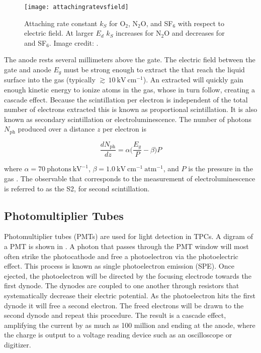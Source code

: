 \begin{figure}
\texttt{[image: attachingratevsfield]}
\caption[Attaching rate constant $k_{S}$ for O$_{2}$, N$_{2}$O, and SF$_{6}$ with respect to electric field.]{Attaching rate constant $k_{S}$
for O$_{2}$, N$_{2}$O, and SF$_{6}$ with respect to electric field.  At
larger $E_d$ $k_{S}$ increases for N$_{2}$O and decreases for \otwo and SF$_{6}$.  Image credit: .}
\label{fig:attachment_rate}
\end{figure}

The anode rests several millimeters above the gate.  The electric field between the gate and anode $E_{g}$ must be strong
enough to extract the \electron that reach the liquid surface into the gas (typically ${\gtrsim}\, 10\ \mathrm{kV\ cm^{-1}}$).  An
extracted \electron will quickly gain enough kinetic energy to ionize atoms in the gas,
whose \electron in turn follow, creating a cascade effect.  Because the scintillation per electron is independent of
the total number of electrons extracted this is known as proportional scintillation.  It is also known as secondary scintillation or
electroluminescence.  The number of photons $N_{\mathrm{ph}}$ produced over a distance $z$ per electron is

\begin{equation}
\frac{dN_{\mathrm{ph}}}{dz} = \alpha \bigg( \frac{E_{g}}{P} - \beta \bigg) P
\label{eq:electronlum}
\end{equation}

\noindent where $\alpha = 70\ \mathrm{photons\ kV^{-1}}$, $\beta = 1.0\ \mathrm{kV\ cm^{-1}\ atm^{-1}}$, and $P$ is the pressure in the
gas .  The observable that corresponds to the measurement of electroluminescence is referred to as the S2, for
second scintillation.


\subsection{Photomultiplier Tubes}
\label{subsec:tpcs_pmts}
Photomultiplier tubes (PMTs) are used for light detection in TPCs.  A digram of a PMT is shown in .  A
photon that
passes through the PMT window will most often strike the photocathode and free a photoelectron via the photoelectric effect.  This process
is known as single photoelectron emission (SPE).  Once ejected, the photoelectron will be directed by the focusing electrode towards the
first dynode.  The dynodes are coupled to one another through resistors that systematically decrease their electric potential.  As the
photoelectron hits the first dynode it will free a second electron.  The freed electrons will be drawn to the
second dynode and repeat this procedure.  The result is a cascade effect, amplifying the current by as much as 100 million and ending
at the anode, where the charge is output to a voltage reading device such as an oscilloscope or digitizer.

